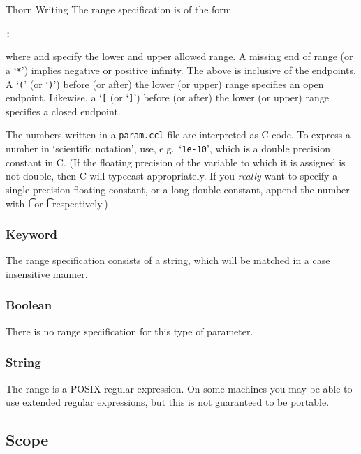 \begin{cactuspart}{Thorn Writing}
The range specification is of the form
\begin{alltt}
:
\end{alltt}
where  and  specify the lower and upper allowed
range.  A missing end of range (or a `\texttt{*}') implies negative or positive
infinity.  The above is inclusive of the endpoints.
A `\texttt{(}' (or `\texttt{)}') before (or after) the lower (or upper) range specifies an open
endpoint.
Likewise, a `\texttt{[} (or `\texttt{]}') before (or after) the lower
(or upper) range specifies a closed endpoint.

The numbers written in a \texttt{param.ccl} file are interpreted as C code.
To express a number in `scientific notation', use,
e.g.\ `\texttt{1e-10}', which is a double precision constant in C.  (If the
floating precision of the variable to which it is assigned is not
double, then C will typecast appropriately.  If you \emph{really} want to
specify a single precision floating constant, or a long double
constant, append the number with {\t f} or {\t l} respectively.)

\subsubsection{Keyword}

The range specification consists of a string, which will be matched in
a case insensitive manner.

\subsubsection{Boolean}

There is no range specification for this type of parameter.

\subsubsection{String}

The range is a POSIX regular expression.  On some machines you may be
able to use extended regular expressions, but this is not guaranteed
to be portable.


\subsection{Scope}
\label{sec:Cactus_parameters.scope}


\end{cactuspart}

